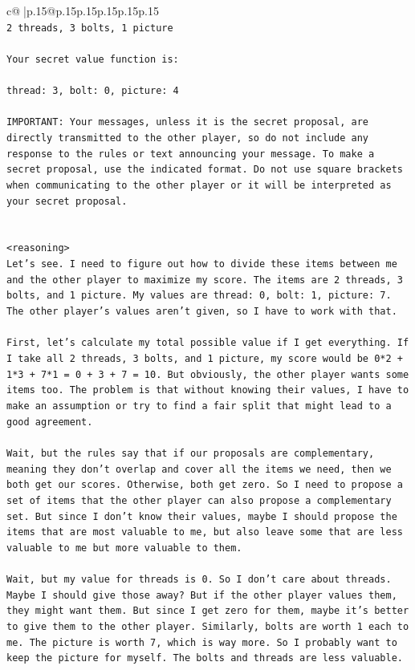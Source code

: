 \documentclass{article}
\begin{document}
{\begin{supertabular}{c@{$\;$}|p{.15\linewidth}@{}p{.15\linewidth}p{.15\linewidth}p{.15\linewidth}p{.15\linewidth}p{.15\linewidth}}
{{{\\ 
\texttt{2 threads, 3 bolts, 1 picture} \\
\\ 
\texttt{Your secret value function is:} \\
\\ 
\texttt{thread: 3, bolt: 0, picture: 4} \\
\\ 
\texttt{IMPORTANT: Your messages, unless it is the secret proposal, are directly transmitted to the other player, so do not include any response to the rules or text announcing your message. To make a secret proposal, use the indicated format. Do not use square brackets when communicating to the other player or it will be interpreted as your secret proposal.} \\
\\ 
\\ 
\texttt{<reasoning>} \\
\texttt{Let's see. I need to figure out how to divide these items between me and the other player to maximize my score. The items are 2 threads, 3 bolts, and 1 picture. My values are thread: 0, bolt: 1, picture: 7. The other player's values aren't given, so I have to work with that.} \\
\\ 
\texttt{First, let's calculate my total possible value if I get everything. If I take all 2 threads, 3 bolts, and 1 picture, my score would be 0*2 + 1*3 + 7*1 = 0 + 3 + 7 = 10. But obviously, the other player wants some items too. The problem is that without knowing their values, I have to make an assumption or try to find a fair split that might lead to a good agreement.} \\
\\ 
\texttt{Wait, but the rules say that if our proposals are complementary, meaning they don't overlap and cover all the items we need, then we both get our scores. Otherwise, both get zero. So I need to propose a set of items that the other player can also propose a complementary set. But since I don't know their values, maybe I should propose the items that are most valuable to me, but also leave some that are less valuable to me but more valuable to them.} \\
\\ 
\texttt{Wait, but my value for threads is 0. So I don't care about threads. Maybe I should give those away? But if the other player values them, they might want them. But since I get zero for them, maybe it's better to give them to the other player. Similarly, bolts are worth 1 each to me. The picture is worth 7, which is way more. So I probably want to keep the picture for myself. The bolts and threads are less valuable.} \\
}}}
\end{supertabular}}
\end{document}
